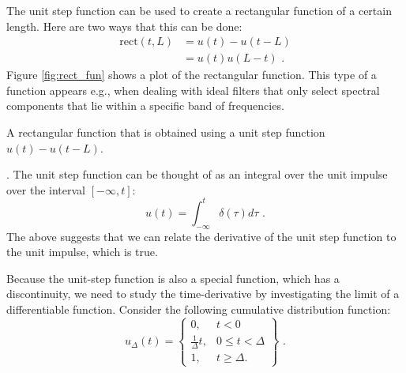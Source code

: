 The unit step function can be used to create a rectangular function of a
certain length. Here are two ways that this can be done:
\begin{align*}
\mathrm{rect}(t,L) &= u(t)-u(t-L)\\
&= u(t) u(L-t) \,\,.
\end{align*}
Figure \ref{fig:rect_fun} shows a plot of the rectangular
function. This type of a function appears e.g., when dealing with
ideal filters that only select spectral components that lie within a
specific band of frequencies.
\begin{marginfigure}[-5cm]
\begin{center}
\end{center}
\caption{A rectangular function that is obtained using a unit step function $u(t)-u(t-L)$.}
\label{fig:rect_fun}
\end{marginfigure}

.  The unit step function can be thought of as an integral over the unit impulse over the interval $[-\infty,t]$:
\begin{equation}
u(t) = \int_{-\infty}^{t} \delta(\tau) d\tau \,\,.
\end{equation}
The above suggests that we can relate the derivative of the unit step
function to the unit impulse, which is true. 

Because the unit-step function is also a special function, which has a
discontinuity, we need to study the time-derivative by investigating
the limit of a differentiable function.  Consider the following
cumulative distribution function:
\begin{equation}
u_{\Delta}(t) = \left\{\begin{array}{cl}
0, & t < 0 \\
\frac{1}{\Delta}t, & 0 \le t < \Delta \\
1, & t \ge \Delta.
\end{array}
\right\} \,\,.
\end{equation}

